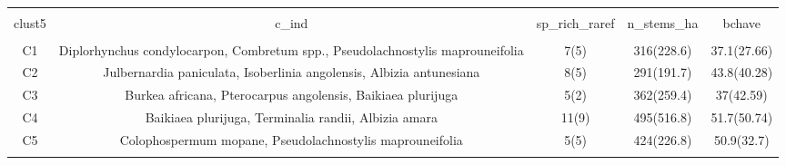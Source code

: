 
\begin{table}[!htbp] \centering 
  \caption{} 
  \label{clust_summ} 
\begin{tabular}{@{\extracolsep{5pt}} ccccc} 
\\[-1.8ex]\hline 
\hline \\[-1.8ex] 
clust5 & c\_ind & sp\_rich\_raref & n\_stems\_ha & bchave \\ 
\hline \\[-1.8ex] 
C1 & Diplorhynchus condylocarpon, Combretum spp., Pseudolachnostylis maprouneifolia & 7(5) & 316(228.6) & 37.1(27.66) \\ 
C2 & Julbernardia paniculata, Isoberlinia angolensis, Albizia antunesiana & 8(5) & 291(191.7) & 43.8(40.28) \\ 
C3 & Burkea africana, Pterocarpus angolensis, Baikiaea plurijuga & 5(2) & 362(259.4) & 37(42.59) \\ 
C4 & Baikiaea plurijuga, Terminalia randii, Albizia amara & 11(9) & 495(516.8) & 51.7(50.74) \\ 
C5 & Colophospermum mopane, Pseudolachnostylis maprouneifolia & 5(5) & 424(226.8) & 50.9(32.7) \\ 
\hline \\[-1.8ex] 
\end{tabular} 
\end{table} 
